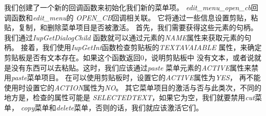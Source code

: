 \documentclass{ctexart}
\begin{document}
我们创建了一个新的回调函数来初始化我们新的菜单项。
\emph{edit\_menu\_open\_cb}回调函数和\emph{edit\_menu}的
\emph{OPEN\_CB}回调相关联。
它将通过一些信息设置剪贴，粘贴，复制，和删除菜单项目是否被激活。
首先，我们需要获得这些元素的句柄。我们通过\emph{IupGetDialogChild}
函数就可以通过元素的\emph{NAME}属性来获取元素的句柄。
接着，我们使用\emph{IupGetInt}函数检查剪贴板的\emph{TEXTAVAIABLE}
属性，来确定剪贴板是否有文本存在。如果这个函数返回$0$，说明剪贴板中
没有文本，或者说就是没有东西可以去粘贴。这时，我们应该通过\emph{paste}
菜单元素的\emph{ACTIVE}属性来禁用\emph{paste}菜单项目。
在可以使用剪贴板时，设置它的\emph{ACTIVE}属性为\emph{YES}，
再不能使用时设置它的\emph{ACTION}属性为\emph{NO}。
其它菜单项目的激活与否与此类次，不同的地方是，检查的属性可能是
\emph{SELECTEDTEXT}，如果它为空，我们就要禁用\emph{cut}菜单，
\emph{copy}菜单和\emph{delete}菜单，否则的话，我们就应该激活它们。
\end{document}
